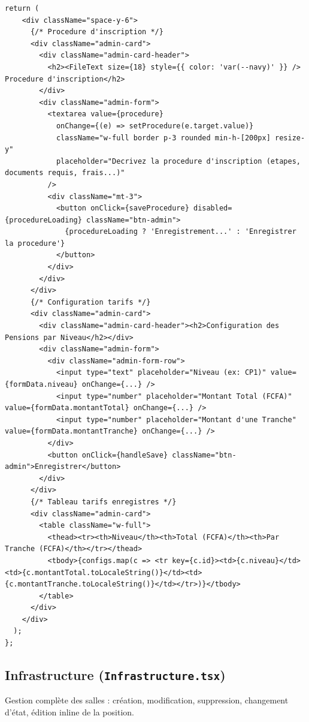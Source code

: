 \documentclass[12pt,a4paper]{article}
\begin{document}
\begin{lstlisting}[style=code]
  return (
    <div className="space-y-6">
      {/* Procedure d'inscription */}
      <div className="admin-card">
        <div className="admin-card-header">
          <h2><FileText size={18} style={{ color: 'var(--navy)' }} /> Procedure d'inscription</h2>
        </div>
        <div className="admin-form">
          <textarea value={procedure}
            onChange={(e) => setProcedure(e.target.value)}
            className="w-full border p-3 rounded min-h-[200px] resize-y"
            placeholder="Decrivez la procedure d'inscription (etapes, documents requis, frais...)"
          />
          <div className="mt-3">
            <button onClick={saveProcedure} disabled={procedureLoading} className="btn-admin">
              {procedureLoading ? 'Enregistrement...' : 'Enregistrer la procedure'}
            </button>
          </div>
        </div>
      </div>
      {/* Configuration tarifs */}
      <div className="admin-card">
        <div className="admin-card-header"><h2>Configuration des Pensions par Niveau</h2></div>
        <div className="admin-form">
          <div className="admin-form-row">
            <input type="text" placeholder="Niveau (ex: CP1)" value={formData.niveau} onChange={...} />
            <input type="number" placeholder="Montant Total (FCFA)" value={formData.montantTotal} onChange={...} />
            <input type="number" placeholder="Montant d'une Tranche" value={formData.montantTranche} onChange={...} />
          </div>
          <button onClick={handleSave} className="btn-admin">Enregistrer</button>
        </div>
      </div>
      {/* Tableau tarifs enregistres */}
      <div className="admin-card">
        <table className="w-full">
          <thead><tr><th>Niveau</th><th>Total (FCFA)</th><th>Par Tranche (FCFA)</th></tr></thead>
          <tbody>{configs.map(c => <tr key={c.id}><td>{c.niveau}</td><td>{c.montantTotal.toLocaleString()}</td><td>{c.montantTranche.toLocaleString()}</td></tr>)}</tbody>
        </table>
      </div>
    </div>
  );
};
\end{lstlisting}

\subsection{Infrastructure (\texttt{Infrastructure.tsx})}

Gestion complète des salles : création, modification, suppression, changement d'état, édition inline de la position.
\end{document}
